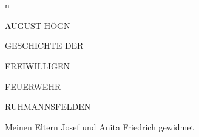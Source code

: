 









n































AUGUST HÖGN



GESCHICHTE DER

FREIWILLIGEN

FEUERWEHR

RUHMANNSFELDEN



Meinen Eltern Josef und Anita Friedrich gewidmet

































































